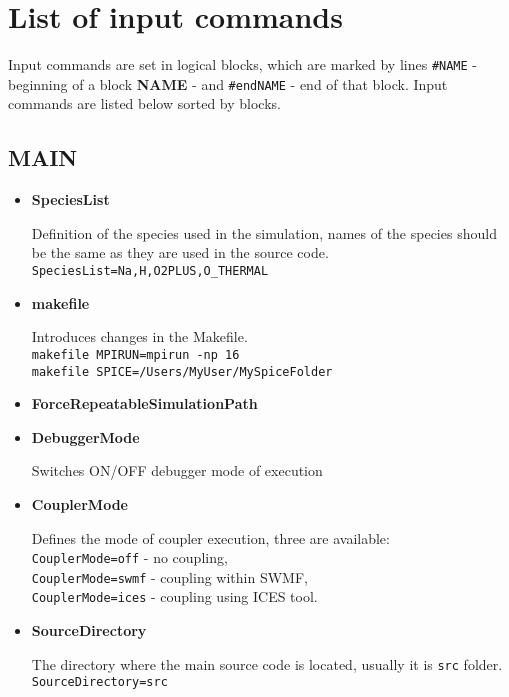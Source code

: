 %
%

\chapter{List of input commands}

Input commands are set in logical blocks, which are
marked by lines \texttt{\#NAME} - beginning of 
a block {\bf NAME} - and \texttt{\#endNAME} - end
of that block. Input commands are listed below 
sorted by blocks.

\section{MAIN}

\begin{itemize}

\item {\bf SpeciesList}

Definition of the species used in the simulation, names of the species should
be the same as they are used in the source code. \\
{\tt SpeciesList=Na,H,O2PLUS,O\_THERMAL}

\item {\bf makefile}

Introduces changes in the Makefile.\\
{\tt makefile MPIRUN=mpirun -np 16}\\
{\tt makefile SPICE=/Users/MyUser/MySpiceFolder}

\item {\bf ForceRepeatableSimulationPath}

\item {\bf DebuggerMode}

Switches ON/OFF debugger mode of execution

\item {\bf CouplerMode}

Defines the mode of coupler execution, three are available:
\\{\tt CouplerMode=off} - no coupling, 
\\{\tt CouplerMode=swmf} - coupling within SWMF, 
\\{\tt CouplerMode=ices} - coupling using ICES tool.

\item {\bf SourceDirectory}

The directory where the main source code is located, usually it is
{\tt src} folder.\\
{\tt SourceDirectory=src}


\end{itemize}
